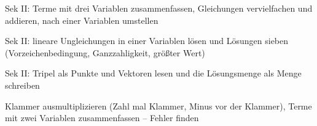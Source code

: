 \begin{aufgabe}{Sek II: Terme mit drei Variablen zusammenfassen, Gleichungen vervielfachen und addieren, nach einer Variablen umstellen}
\end{aufgabe}

\begin{aufgabe}{Sek II: lineare Ungleichungen in einer Variablen lösen und Lösungen sieben (Vorzeichenbedingung, Ganzzahligkeit, größter Wert)}
\end{aufgabe}

\begin{aufgabe}{Sek II: Tripel als Punkte und Vektoren lesen und die Lösungsmenge als Menge schreiben}
\end{aufgabe}

\begin{aufgabe}{Klammer ausmultiplizieren (Zahl mal Klammer, Minus vor der Klammer), Terme mit zwei Variablen zusammenfassen – Fehler finden}
\end{aufgabe}

